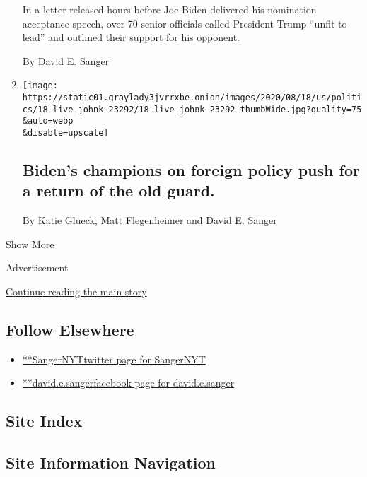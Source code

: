 \begin{enumerate}
  In a letter released hours before Joe Biden delivered his nomination
  acceptance speech, over 70 senior officials called President Trump
  ``unfit to lead'' and outlined their support for his opponent.

  By David E. Sanger
\item
  \href{/2020/08/19/us/elections/bidens-champions-on-foreign-policy-push-for-a-return-of-the-old-guard.html}{}

  \texttt{[image: https://static01.graylady3jvrrxbe.onion/images/2020/08/18/us/politics/18-live-johnk-23292/18-live-johnk-23292-thumbWide.jpg?quality=75\\\&auto=webp\\\&disable=upscale]}

  \hypertarget{bidens-champions-on-foreign-policy-push-for-a-return-of-the-old-guard}{%
  \subsection{Biden's champions on foreign policy push for a return of
  the old
  guard.}\label{bidens-champions-on-foreign-policy-push-for-a-return-of-the-old-guard}}

  By Katie Glueck, Matt Flegenheimer and David E. Sanger
\end{enumerate}

Show More

Advertisement

\protect\hyperlink{after-mid2}{Continue reading the main story}

\hypertarget{follow-elsewhere}{%
\subsection{Follow Elsewhere}\label{follow-elsewhere}}

\begin{itemize}
\tightlist
\item
  \href{https://twitter.com/SangerNYT}{**SangerNYTtwitter page for
  SangerNYT}
\item
  \href{https://www.facebookcorewwwi.onion/david.e.sanger}{**david.e.sangerfacebook
  page for david.e.sanger}
\end{itemize}

\hypertarget{site-index}{%
\subsection{Site Index}\label{site-index}}

\hypertarget{site-information-navigation}{%
\subsection{Site Information
Navigation}\label{site-information-navigation}}


